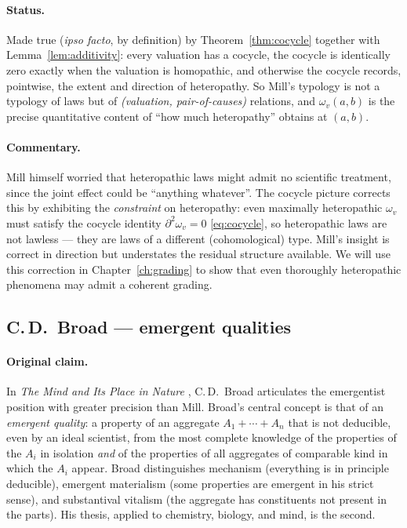 \paragraph{Status.} Made true (\emph{ipso facto}, by definition) by
Theorem~\ref{thm:cocycle} together with Lemma~\ref{lem:additivity}: every
valuation has a cocycle, the cocycle is identically zero exactly when the
valuation is homopathic, and otherwise the cocycle records, pointwise, the
extent and direction of heteropathy. So Mill's typology is not a typology of
laws but of \emph{(valuation, pair-of-causes)} relations, and
$\omega_v(a,b)$ is the precise quantitative content of ``how much
heteropathy'' obtains at $(a,b)$.

\paragraph{Commentary.} Mill himself worried that heteropathic laws might
admit no scientific treatment, since the joint effect could be ``anything
whatever''. The cocycle picture corrects this by exhibiting the
\emph{constraint} on heteropathy: even maximally heteropathic $\omega_v$
must satisfy the cocycle identity $\partial^2\omega_v = 0$
\eqref{eq:cocycle}, so heteropathic laws are not lawless --- they are
laws of a different (cohomological) type. Mill's insight is correct in
direction but understates the residual structure available. We will use this
correction in Chapter~\ref{ch:grading} to show that even thoroughly
heteropathic phenomena may admit a coherent grading.

\subsection{C.\,D.\ Broad --- emergent qualities}\label{sec:zoo:broad}

\paragraph{Original claim.} In \emph{The Mind and Its Place in Nature}
\cite{Broad1925}, C.\,D.\ Broad articulates the emergentist position with
greater precision than Mill. Broad's central concept is that of an
\emph{emergent quality}: a property of an aggregate $A_1 + \cdots + A_n$
that is not deducible, even by an ideal scientist, from the most complete
knowledge of the properties of the $A_i$ in isolation \emph{and} of the
properties of all aggregates of comparable kind in which the $A_i$
appear. Broad distinguishes mechanism (everything is in principle
deducible), emergent materialism (some properties are emergent in his
strict sense), and substantival vitalism (the aggregate has constituents not
present in the parts). His thesis, applied to chemistry, biology, and mind,
is the second.

